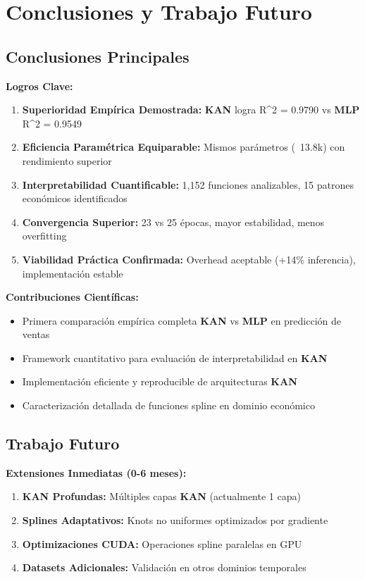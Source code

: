 \documentclass[10pt,twocolumn]{article}
\newcommand{\kan}{\textbf{KAN}}
\newcommand{\mlp}{\textbf{MLP}}
\newcommand{\rsquared}{R^2}
\begin{document}
\section{Conclusiones y Trabajo Futuro}

\subsection{Conclusiones Principales}

\textbf{Logros Clave:}
\begin{enumerate}
    \item \textbf{Superioridad Empírica Demostrada:} \kan{} logra \rsquared{} = 0.9790 vs \mlp{} \rsquared{} = 0.9549
    \item \textbf{Eficiencia Paramétrica Equiparable:} Mismos parámetros (~13.8k) con rendimiento superior
    \item \textbf{Interpretabilidad Cuantificable:} 1,152 funciones analizables, 15 patrones económicos identificados
    \item \textbf{Convergencia Superior:} 23 vs 25 épocas, mayor estabilidad, menos overfitting
    \item \textbf{Viabilidad Práctica Confirmada:} Overhead aceptable (+14\% inferencia), implementación estable
\end{enumerate}

\textbf{Contribuciones Científicas:}
\begin{itemize}
    \item Primera comparación empírica completa \kan{} vs \mlp{} en predicción de ventas
    \item Framework cuantitativo para evaluación de interpretabilidad en \kan
    \item Implementación eficiente y reproducible de arquitecturas \kan
    \item Caracterización detallada de funciones spline en dominio económico
\end{itemize}

\subsection{Trabajo Futuro}

\textbf{Extensiones Inmediatas (0-6 meses):}
\begin{enumerate}
    \item \textbf{KAN Profundas:} Múltiples capas \kan{} (actualmente 1 capa)
    \item \textbf{Splines Adaptativos:} Knots no uniformes optimizados por gradiente
    \item \textbf{Optimizaciones CUDA:} Operaciones spline paralelas en GPU
    \item \textbf{Datasets Adicionales:} Validación en otros dominios temporales
\end{enumerate}
\end{document}
